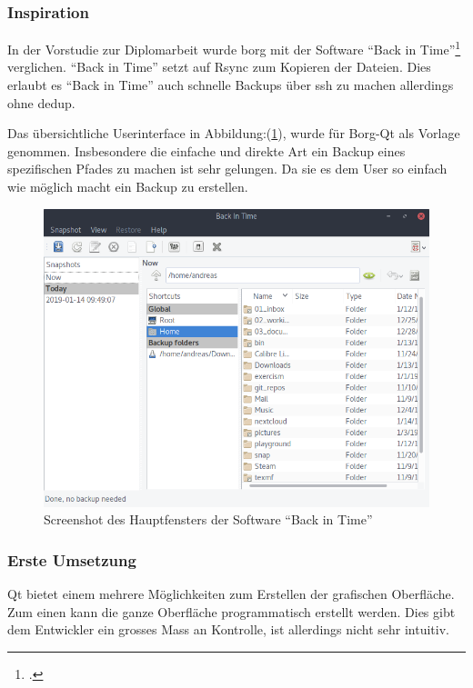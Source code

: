 \subsubsection{Inspiration}
\label{sec:orge74a4b2}

In der Vorstudie zur Diplomarbeit wurde \gls{borg} mit der Software "`Back in
Time"'\footcite{backintime} verglichen. "`Back in Time"' setzt auf Rsync zum
Kopieren der Dateien. Dies erlaubt es "`Back in Time"' auch schnelle Backups über
\gls{ssh} zu machen allerdings ohne \gls{dedup}.

Das übersichtliche Userinterface in Abbildung:(\ref{fig:org4e63253}), wurde für Borg-Qt
als Vorlage genommen. Insbesondere die einfache und direkte Art ein Backup
eines spezifischen Pfades zu machen ist sehr gelungen. Da sie es dem User so
einfach wie möglich macht ein Backup zu erstellen.

\begin{figure}[htbp]
\centering
\includegraphics[width=.9\linewidth]{pictures/bit_main.png}
\caption{\label{fig:org4e63253}
Screenshot des Hauptfensters der Software "`Back in Time"'}
\end{figure}

\subsubsection{Erste Umsetzung}
\label{sec:org040cd93}

Qt bietet einem mehrere Möglichkeiten zum Erstellen der grafischen Oberfläche.
Zum einen kann die ganze Oberfläche programmatisch erstellt werden. Dies gibt
dem Entwickler ein grosses Mass an Kontrolle, ist allerdings nicht sehr
intuitiv.

